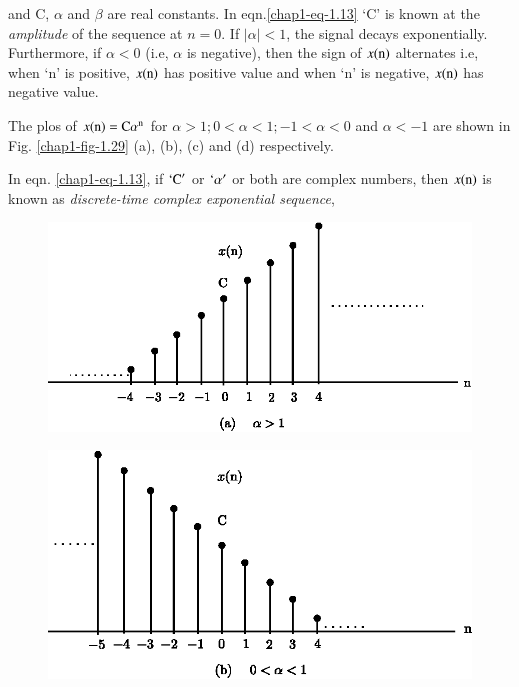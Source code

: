 and C, $\alpha$ and $\beta$ are real constants. In eqn.\ref{chap1-eq-1.13} `C' is known at the \textit{amplitude} of the sequence at $n=0$. If $|\alpha| < 1$, the signal decays exponentially. Furthermore, if $\alpha < 0$ (i.e, $\alpha$ is negative), then the sign of $x(\textrm{n})$ alternates i.e, when `n' is positive, $x(\textrm{n})$ has positive value and when `n' is negative, $x(\textrm{n})$ has negative value.

The plos of $x(\textrm{n}) = \textrm{C} \alpha^{\textrm{n}}$ for $\alpha > 1; 0< \alpha < 1 ; -1 < \alpha < 0$ and $\alpha < -1$  are shown in Fig. \ref{chap1-fig-1.29} (a), (b), (c) and (d) respectively.

In eqn. \ref{chap1-eq-1.13}, if $`\textrm{C}'$ or $`\alpha'$ or both are complex numbers, then $x(\textrm{n})$ is known as \textit{discrete-time complex exponential sequence},

\begin{figure}[H]
\centering
\includegraphics{src/chap1/fig.1.15(a).eps}
\end{figure}

\begin{figure}[H]
\centering
\includegraphics{src/chap1/fig.1.15(b).eps}
\end{figure}

